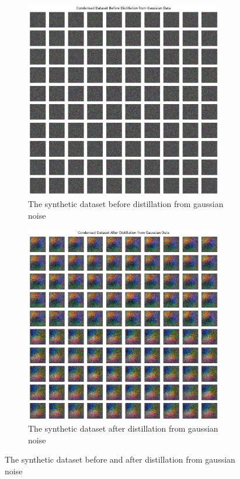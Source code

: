 \documentclass[onecolumn]{IEEEtran}
\begin{document}
\begin{figure}[H]
    \centering
    \begin{subfigure}{.5\textwidth}
        \centering
        \includegraphics[width=0.95\textwidth]{images/MHIST_pad_before_distil_gaussian.png}
        \caption{The synthetic dataset before distillation from gaussian noise}
        \label{fig:MHIST_pad_before_distil_gaussian}
    \end{subfigure}%
    \begin{subfigure}{.5\textwidth}
        \centering
        \includegraphics[width=0.95\textwidth]{images/MHIST_pad_after_distil_gaussian.png}
        \caption{The synthetic dataset after distillation from gaussian noise}
        \label{fig:MHIST_pad_after_distil_gaussian}
    \end{subfigure}
    \caption{The synthetic dataset before and after distillation from gaussian noise}
\end{figure}
\end{document}
